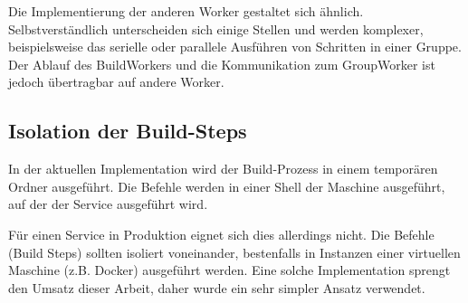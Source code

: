 Die Implementierung der anderen Worker gestaltet sich ähnlich. Selbstverständlich unterscheiden sich einige Stellen und werden komplexer, beispielsweise das serielle oder parallele Ausführen von Schritten in einer Gruppe. Der Ablauf des BuildWorkers und die Kommunikation zum GroupWorker ist jedoch übertragbar auf andere Worker.

\subsection{Isolation der Build-Steps}

In der aktuellen Implementation wird der Build-Prozess in einem temporären Ordner ausgeführt. Die Befehle werden in einer Shell der Maschine ausgeführt, auf der der Service ausgeführt wird.

Für einen Service in Produktion eignet sich dies allerdings nicht. Die Befehle (Build Steps) sollten isoliert voneinander, bestenfalls in Instanzen einer virtuellen Maschine (z.B. Docker) ausgeführt werden. Eine solche Implementation sprengt den Umsatz dieser Arbeit, daher wurde ein sehr simpler Ansatz verwendet.

